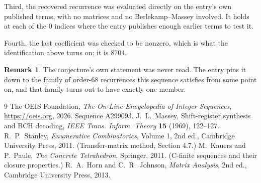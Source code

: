 \documentclass[11pt,a4paper]{article}
\theoremstyle{plain}
\theoremstyle{definition}
\newtheorem{remark}[theorem]{Remark}
\begin{document}
Third, the recovered recurrence was evaluated directly on the entry's own published terms, with
no matrices and no Berlekamp--Massey involved. It holds at each of the $0$ indices where
the entry publishes enough earlier terms to test it.

Fourth, the last coefficient was checked to be nonzero, which is what the identification above
turns on; it is $8704$.

\begin{remark}
The conjecture's own statement was never read. The entry pins it down to the family of
order-$68$ recurrences this sequence satisfies from some point on, and that family turns
out to have exactly one member.
\end{remark}

\begin{thebibliography}{9}
 The OEIS Foundation, \emph{The On-Line Encyclopedia of Integer
Sequences}, \url{https://oeis.org}, 2026. Sequence A299093.
 J.~L.~Massey, Shift-register synthesis and BCH decoding, \emph{IEEE
Trans. Inform. Theory} \textbf{15} (1969), 122--127.
 R.~P.~Stanley, \emph{Enumerative Combinatorics}, Volume 1, 2nd ed.,
Cambridge University Press, 2011. (Transfer-matrix method, Section 4.7.)
 M.~Kauers and P.~Paule, \emph{The Concrete Tetrahedron}, Springer, 2011.
(C-finite sequences and their closure properties.)
 R.~A.~Horn and C.~R.~Johnson, \emph{Matrix Analysis}, 2nd ed., Cambridge
University Press, 2013.
\end{thebibliography}
\end{document}
